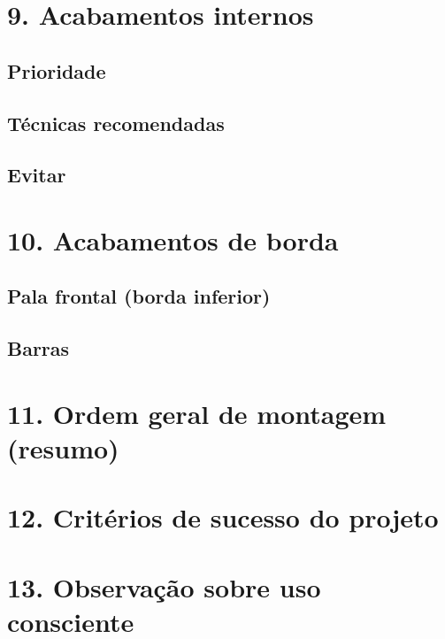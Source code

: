 \documentclass[
  brazilian,
  8pt,
  oneside]{book}
\begin{document}
\section{9. Acabamentos internos}\label{acabamentos-internos}

\subsection{Prioridade}\label{prioridade}

\subsection{Técnicas recomendadas}\label{tuxe9cnicas-recomendadas}

\subsection{Evitar}\label{evitar}

\section{10. Acabamentos de borda}\label{acabamentos-de-borda}

\subsection{Pala frontal (borda inferior)}\label{pala-frontal-borda-inferior}

\subsection{Barras}\label{barras}

\section{11. Ordem geral de montagem (resumo)}\label{ordem-geral-de-montagem-resumo}

\section{12. Critérios de sucesso do projeto}\label{crituxe9rios-de-sucesso-do-projeto}

\section{13. Observação sobre uso consciente}\label{observauxe7uxe3o-sobre-uso-consciente}
\end{document}
